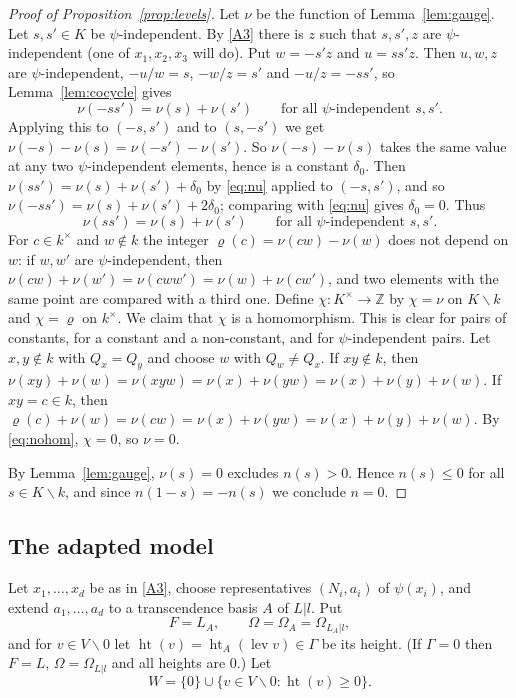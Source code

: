 \documentclass[11pt]{amsart}
\theoremstyle{definition}
\theoremstyle{remark}
\newcommand{\ZZ}{\mathbb{Z}}
\newcommand{\lev}{\operatorname{lev}}
\newcommand{\hgt}{\operatorname{ht}}
\newcommand{\sm}{\smallsetminus}
\begin{document}
\begin{proof}[Proof of Proposition~\ref{prop:levels}]
Let $\nu$ be the function of Lemma~\ref{lem:gauge}. Let $s,s'\in K$ be $\psi$-independent. By \ref{A3} there is $z$ such that $s,s',z$ are $\psi$-independent (one of $x_1,x_2,x_3$ will do). Put $w=-s'z$ and $u=ss'z$.
Then $u,w,z$ are $\psi$-independent, $-u/w=s$, $-w/z=s'$ and $-u/z=-ss'$, so Lemma~\ref{lem:cocycle} gives
\begin{equation}\label{eq:nu}
\nu(-ss')=\nu(s)+\nu(s')\qquad\text{for all $\psi$-independent }s,s'.
\end{equation}
Applying this to $(-s,s')$ and to $(s,-s')$ we get $\nu(-s)-\nu(s)=\nu(-s')-\nu(s')$. So $\nu(-s)-\nu(s)$ takes the same value at any two $\psi$-independent elements, hence is a constant $\delta_0$.
Then $\nu(ss')=\nu(s)+\nu(s')+\delta_0$ by \eqref{eq:nu} applied to $(-s,s')$, and so $\nu(-ss')=\nu(s)+\nu(s')+2\delta_0$; comparing with \eqref{eq:nu} gives $\delta_0=0$. Thus
\[ \nu(ss')=\nu(s)+\nu(s')\qquad\text{for all $\psi$-independent }s,s'. \]
For $c\in k^\times$ and $w\notin k$ the integer $\varrho(c)=\nu(cw)-\nu(w)$ does not depend on $w$: if $w,w'$ are $\psi$-independent, then $\nu(cw)+\nu(w')=\nu(cww')=\nu(w)+\nu(cw')$, and two elements with the same point are compared with a third one.
Define $\chi\colon K^\times\to\ZZ$ by $\chi=\nu$ on $K\sm k$ and $\chi=\varrho$ on $k^\times$. We claim that $\chi$ is a homomorphism. This is clear for pairs of constants, for a constant and a non-constant, and for $\psi$-independent pairs.
Let $x,y\notin k$ with $Q_x=Q_y$ and choose $w$ with $Q_w\neq Q_x$. If $xy\notin k$, then $\nu(xy)+\nu(w)=\nu(xyw)=\nu(x)+\nu(yw)=\nu(x)+\nu(y)+\nu(w)$. If $xy=c\in k$, then $\varrho(c)+\nu(w)=\nu(cw)=\nu(x)+\nu(yw)=\nu(x)+\nu(y)+\nu(w)$.
By \eqref{eq:nohom}, $\chi=0$, so $\nu=0$.

By Lemma~\ref{lem:gauge}, $\nu(s)=0$ excludes $n(s)>0$. Hence $n(s)\le0$ for all $s\in K\sm k$, and since $n(1-s)=-n(s)$ we conclude $n=0$.
\end{proof}

\subsection{The adapted model}\label{ss:model}
Let $x_1,\dots,x_d$ be as in \ref{A3}, choose representatives $(N_i,a_i)$ of $\psi(x_i)$, and extend $a_1,\dots,a_d$ to a transcendence basis $A$ of $L|l$. Put
\[ F=L_A,\qquad \Omega=\Omega_A=\Omega_{L_A|l}, \]
and for $v\in V\sm0$ let $\hgt(v)=\hgt_A(\lev v)\in\Gamma$ be its height. (If $\Gamma=0$ then $F=L$, $\Omega=\Omega_{L|l}$ and all heights are $0$.) Let
\[ W=\{0\}\cup\{v\in V\sm0:\hgt(v)\geq0\}. \]
\end{document}
